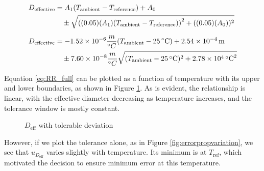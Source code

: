 \documentclass[12pt, letterpaper]{report}%
\newcommand{\degC}{^{\circ}C}    %
\begin{document}
\begin{appendices}
        \begin{align}
            D_{\text{effective}} &= A_1(T_{\text{ambient}}-T_{\text{reference}}) + A_0 \notag \\
                &\quad \pm \sqrt{\left( (0.05)(A_1)(T_{\text{ambient}}-T_{\text{reference}}) \right)^2 + ((0.05)(A_0))^2} \label{eq:RR_symb}
            \\[6pt]
            D_{\text{effective}} &= \SI{-1.52e-6}{} \frac{m}{\degC} (T_{\text{ambient}} - \SI{25}{\degreeCelsius}) + \SI{2.54e-4}{\meter} \notag \\
                &\quad \pm \SI{7.60e-8}{} \frac{m}{\degC} \sqrt{(T_{\text{ambient}} - \SI{25}{\degreeCelsius})^2 + \SI{2.78e4}{\degreeCelsius\squared}} \label{eq:RR_full}
        \end{align}

    Equation \ref{eq:RR_full} can be plotted as a function of temperature with its upper and lower boundaries, as shown in Figure \ref{fig:errorpropboundary}.
    As is evident, the relationship is linear, with the effective diameter decreasing as temperature increases, and the tolerance window is mostly constant.

        \begin{figure}[H]
            \centering
            \caption{$D_{\text{eff}}$ with tolerable deviation}
            \label{fig:errorpropboundary}
        \end{figure}

    However, if we plot the tolerance alone, as in Figure \ref{fig:errorpropvariation}, we see that $u_{D_{\text{eff}}}$ varies slightly with temperature.
    Its minimum is at $T_{\text{ref}}$, which motivated the decision to ensure minimum error at this temperature.


\end{appendices}
\end{document}
